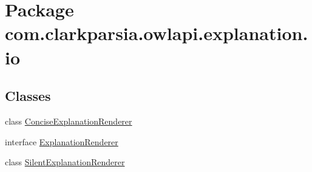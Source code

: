 \hypertarget{namespacecom_1_1clarkparsia_1_1owlapi_1_1explanation_1_1io}{\section{Package com.\-clarkparsia.\-owlapi.\-explanation.\-io}
\label{namespacecom_1_1clarkparsia_1_1owlapi_1_1explanation_1_1io}
}
\subsection*{Classes}
\begin{DoxyCompactItemize}
\item 
class \hyperlink{classcom_1_1clarkparsia_1_1owlapi_1_1explanation_1_1io_1_1_concise_explanation_renderer}{Concise\-Explanation\-Renderer}
\item 
interface \hyperlink{interfacecom_1_1clarkparsia_1_1owlapi_1_1explanation_1_1io_1_1_explanation_renderer}{Explanation\-Renderer}
\item 
class \hyperlink{classcom_1_1clarkparsia_1_1owlapi_1_1explanation_1_1io_1_1_silent_explanation_renderer}{Silent\-Explanation\-Renderer}
\end{DoxyCompactItemize}
